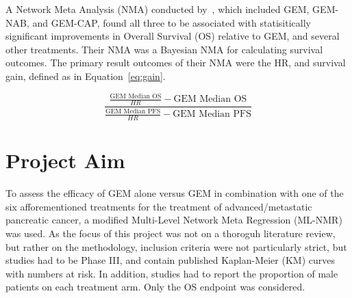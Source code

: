 A Network Meta Analysis (NMA) conducted by~\cite{gresham2014}, which included GEM, GEM-NAB, and GEM-CAP, found all three to be associated with statisitically significant improvements in Overall Survival (OS) relative to GEM, and several other treatments. Their NMA was a Bayesian NMA for calculating survival outcomes. The primary result outcomes of their NMA were the HR, and survival gain, defined as in Equation~\ref{eq:gain}. 

\begin{equation}
    \frac{\frac{\text{GEM Median OS}}{HR}-\text{GEM Median OS}}{\frac{\text{GEM Median PFS}}{HR}-\text{GEM Median PFS}}
    \label{eq:gain}
\end{equation}

\section{Project Aim}
To assess the efficacy of GEM alone versus GEM in combination with one of the six afforementioned treatments for the treatment of advanced/metastatic pancreatic cancer, a modified Multi-Level Network Meta Regression (ML-NMR) was used. As the focus of this project was not on a thoroguh literature review, but rather on the methodology, inclusion criteria were not particularly strict, but studies had to be Phase III, and contain published Kaplan-Meier (KM) curves with numbers at risk. In addition, studies had to report the proportion of male patients on each treatment arm. Only the OS endpoint was considered. 

